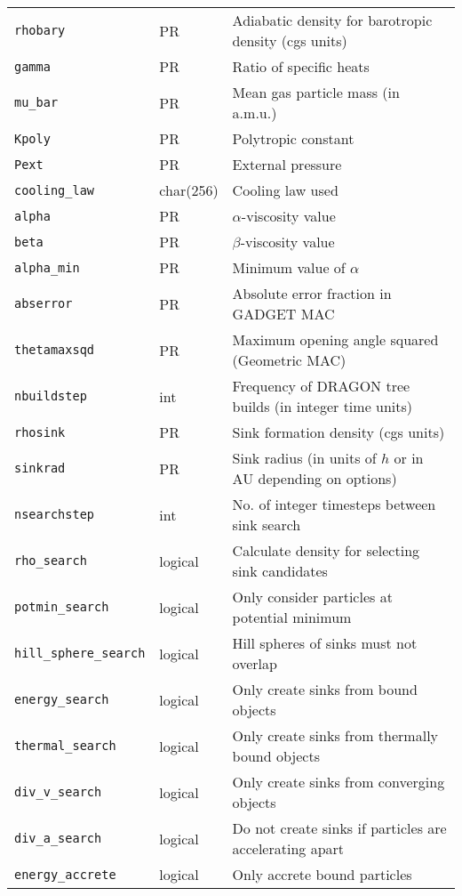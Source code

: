 \documentclass[a4paper]{article}
\newcommand{\var}[1]{\texttt{#1}}
\begin{document}
\begin{center}
\begin{supertabular}{|p{3cm}|p{2cm}|p{8cm}|}
\var{rhobary}    & PR       & Adiabatic density for barotropic density (cgs units) \\
\var{gamma}      & PR       & Ratio of specific heats \\
\var{mu\_bar}    & PR       & Mean gas particle mass (in a.m.u.) \\
\var{Kpoly}      & PR       & Polytropic constant \\ 
\var{Pext}       & PR       & External pressure \\ \hline
\var{cooling\_law} & char(256) & Cooling law used \\ \hline
\var{alpha}      & PR       & $\alpha$-viscosity value \\
\var{beta}       & PR       & $\beta$-viscosity value \\
\var{alpha\_min} & PR       & Minimum value of $\alpha$ \\ \hline
\var{abserror}   & PR       & Absolute error fraction in GADGET MAC \\ 
\var{thetamaxsqd}& PR       & Maximum opening angle squared (Geometric MAC) \\
\var{nbuildstep} & int      & Frequency of DRAGON tree builds (in integer time units) \\ \hline
\var{rhosink}    & PR       & Sink formation density (cgs units) \\
\var{sinkrad}    & PR       & Sink radius (in units of $h$ or in AU depending on options) \\
\var{nsearchstep} & int     & No. of integer timesteps between sink search \\
\var{rho\_search} & logical & Calculate density for selecting sink candidates \\
\var{potmin\_search} & logical & Only consider particles at potential minimum \\
\var{hill\_sphere\_search} & logical & Hill spheres of sinks must not overlap \\
\var{energy\_search}  & logical & Only create sinks from bound objects \\
\var{thermal\_search}  & logical & Only create sinks from thermally bound objects \\
\var{div\_v\_search}  & logical & Only create sinks from converging objects \\
\var{div\_a\_search}  & logical & Do not create sinks if particles are accelerating apart \\ \hline
\var{energy\_accrete} & logical & Only accrete bound particles \\

\end{supertabular}
\end{center}
\end{document}
